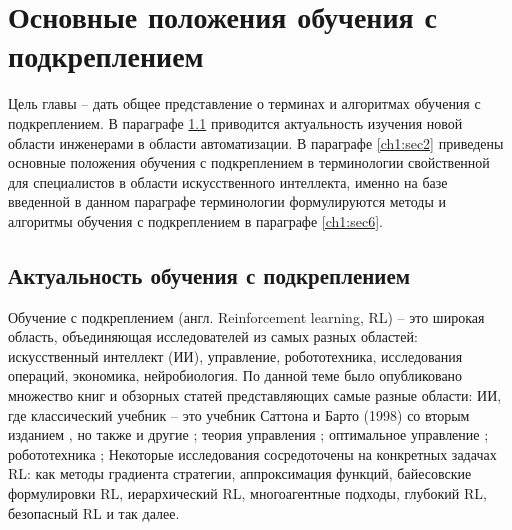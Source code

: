 \chapter{Основные положения обучения с подкреплением}


Цель главы -- дать общее представление о терминах и алгоритмах обучения с подкреплением. В параграфе \ref{ch1:sec1} приводится актуальность изучения новой области инженерами в области автоматизации. В параграфе \ref{ch1:sec2} приведены основные положения обучения с подкреплением в терминологии свойственной для специалистов в области искусственного интеллекта, именно на базе введенной в данном параграфе терминологии формулируются методы и алгоритмы обучения с подкреплением в параграфе \ref{ch1:sec6}.
\section{Актуальность обучения с подкреплением}
\label{ch1:sec1}

Обучение с подкреплением (англ. Reinforcement learning, RL) -- это широкая область, объединяющая исследователей из самых разных областей: искусственный интеллект (ИИ), управление, робототехника, исследования операций, экономика, нейробиология. По данной теме было опубликовано множество книг и обзорных статей представляющих самые разные области: ИИ, где классический учебник -- это учебник Саттона и Барто (1998) \cite{sutton1998introduction} со вторым изданием \cite{sutton2018reinforcement}, но также и другие \cite{littman1996reinforcement,van2012reinforcement}; теория управления \cite{lewis2012reinforcement}; оптимальное управление \cite{bertsekas1996neuro, powell2007approximate}; робототехника \cite{deisenroth2013survey}; Некоторые исследования сосредоточены на конкретных задачах RL: как методы градиента стратегии, аппроксимация функций, байесовские формулировки RL, иерархический RL, многоагентные подходы, глубокий RL, безопасный RL и так далее.

